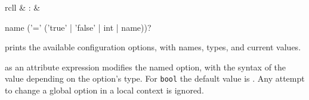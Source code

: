 \begin{isabellebody}
\begin{isamarkuptext}
  \begin{matharray}{rcll}
    \hypertarget{command.print_configs}{\hyperlink{command.print_configs}{\mbox{}}} & : &  \\
  \end{matharray}

  \begin{rail}
    name ('=' ('true' | 'false' | int | name))?
  \end{rail}

  \begin{descr}
  
  \item [\hyperlink{command.print_configs}{\mbox{\isa{\isacommand{print{\isacharunderscore}configs}}}}] prints the available
  configuration options, with names, types, and current values.
  
  \item [\isa{{\isachardoublequote}name\ {\isacharequal}\ value{\isachardoublequote}}] as an attribute expression modifies
  the named option, with the syntax of the value depending on the
  option's type.  For \verb|bool| the default value is .  Any attempt to change a global option in a local context is
  ignored.


\end{descr}
\end{isamarkuptext}
\end{isabellebody}
